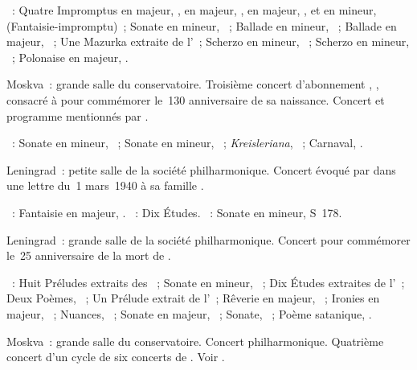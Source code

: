 \begin{description}
 \textsc{\Chopin{}}~: Quatre Impromptus en \kF \Sharp majeur, , en
 \kA \Flat majeur, , en \kG \Flat majeur, , et en \kC
 \Sharp mineur,  (Fantaisie-impromptu)~; Sonate en \kB mineur,
 ~; Ballade en \kG mineur, ~; Ballade en \kA \Flat majeur,
 ~; Une Mazurka extraite de l'~; Scherzo en \kB mineur,
 ~; Scherzo en \kC \Sharp mineur, ~; Polonaise en \kA
 \Flat majeur, .
 \item[\DateWithWeekDay{1940-02-20}]
 Moskva~: grande salle du conservatoire.
 Troisième concert d'abonnement , ,
 consacré à \Schumann{} pour commémorer le~130\ieme{} anniversaire de sa
 naissance.
 Concert et programme mentionnés par \citet[p.~162]{Nekrasova08}.

 \textsc{\Schumann{}}~: Sonate en \kF mineur, ~; Sonate en \kG
 mineur, ~; \emph{Kreisleriana}, ~; Carnaval, .
 \item[\DateWithWeekDay{1940-02-24}]
 Leningrad~: petite salle de la société philharmonique.
 Concert évoqué par \VSofronitsky{} dans une lettre du~1\ier{} mars~1940 à
 sa famille \citep[p.~28]{Kogan08}.

 \textsc{\Schumann{}}~: Fantaisie en \kC majeur, .
 \textsc{\Chopin{}}~: Dix Études.
 \textsc{\Liszt{}}~: Sonate en \kB mineur, S~178.
 \item[\DateWithWeekDay{1940-03-22}]
 Leningrad~: grande salle de la société philharmonique.
 Concert pour commémorer le~25\ieme{} anniversaire de la mort de
 \Scriabine{}.

 \textsc{\Scriabine{}}~: Huit Préludes extraits des ~; Sonate en \kF \Sharp mineur, ~; Dix Études extraites de
 l'~; Deux Poèmes, ~; Un Prélude extrait de l'~;
 Rêverie en \kC majeur,  ~; Ironies en \kC majeur,
  ~; Nuances,  ~; Sonate en \kF \Sharp
 majeur, ~; Sonate, ~; Poème satanique, .
 \item[\DateWithWeekDay{1940-03-25}]
 Moskva~: grande salle du conservatoire.
 Concert philharmonique.
 Quatrième concert d'un cycle de six concerts de \VSofronitsky{}.
 Voir \citet{Lazarev20}.


\end{description}
